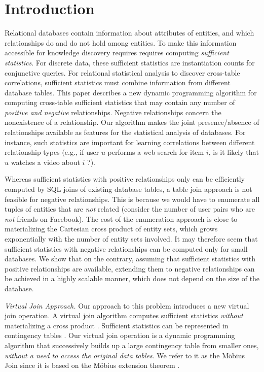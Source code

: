 \documentclass{sig-alternate-2013}
\begin{document}
 
\section{Introduction} Relational databases contain information about attributes of entities, and which relationships do and do not hold among entities. To make this information accessible for knowledge discovery requires requires computing {\em sufficient statistics}. For discrete data, these sufficient statistics are instantiation counts for conjunctive queries. 
For relational statistical analysis to discover cross-table correlations,  sufficient statistics must combine information from different database tables. This paper describes a new dynamic programming algorithm for computing cross-table sufficient statistics that may contain any number of {\em positive and negative} relationships. Negative relationships concern the nonexistence of a relationship. Our algorithm makes the joint presence/absence of relationships available as features for the statistical analysis of databases. For instance, such statistics are important for learning correlations between different relationship types (e.g., if user $u$ performs a web search for item $i$, is it likely that $u$ watches a video about $i$ ?). 

Whereas sufficient statistics with positive relationships only can be efficiently computed by SQL joins of existing database tables, a table join approach is not feasible for negative relationships. This is because we would have to enumerate all tuples of entities that are {\em not} related (consider the number of user pairs who are {\em not} friends on Facebook). The cost of the enumeration approach is close to materializing the Cartesian cross product of entity sets, which grows exponentially with the number of entity sets involved. It may therefore seem that sufficient statistics with negative relationships can be computed only for small databases. 
We show that on the contrary, assuming that sufficient statistics with positive relationships are available, extending them to negative relationships can be achieved in a highly scalable manner, which does not depend on the size of the database.

\emph{Virtual Join Approach.} Our approach to this problem introduces a new virtual join operation. A virtual join algorithm computes sufficient statistics {\em without} materializing a cross product \cite{Yin2004}. Sufficient statistics can be represented in contingency tables \cite{Moore1998}. Our virtual join operation is a dynamic programming algorithm that successively builds up a large contingency table from smaller ones, {\em without a need to access the original data tables}. We refer to it as the M\"obius Join since it is based on the M\"obius extension theorem \cite{Schulte2014}.
%
\end{document}
